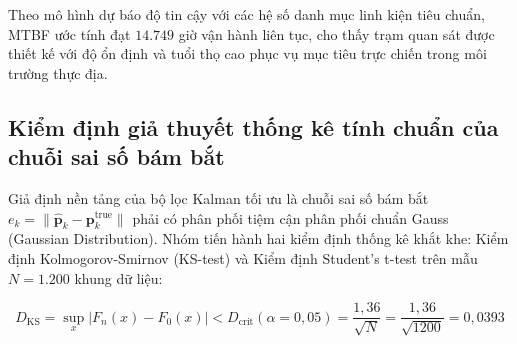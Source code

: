 \begin{table}[H]
\centering
\caption{Phân rã tỷ lệ hỏng hóc và độ tin cậy các khối phần cứng trong trạm quan sát}
\label{tab:hardware-reliability-breakdown}
\end{table}

Theo mô hình dự báo độ tin cậy với các hệ số danh mục linh kiện tiêu chuẩn, MTBF ước tính đạt $14.749$ giờ vận hành liên tục, cho thấy trạm quan sát được thiết kế với độ ổn định và tuổi thọ cao phục vụ mục tiêu trực chiến trong môi trường thực địa.

\subsection{Kiểm định giả thuyết thống kê tính chuẩn của chuỗi sai số bám bắt}

\hspace{0.5cm} Giả định nền tảng của bộ lọc Kalman tối ưu là chuỗi sai số bám bắt $e_k = \|\hat{\mathbf{p}}_k - \mathbf{p}_k^{\text{true}}\|$ phải có phân phối tiệm cận phân phối chuẩn Gauss (Gaussian Distribution). Nhóm tiến hành hai kiểm định thống kê khắt khe: Kiểm định Kolmogorov-Smirnov (KS-test) và Kiểm định Student's t-test trên mẫu $N = 1.200$ khung dữ liệu:

\begin{equation}
D_{\text{KS}} = \sup_x |F_n(x) - F_0(x)| < D_{\text{crit}}(\alpha = 0{,}05) = \frac{1{,}36}{\sqrt{N}} = \frac{1{,}36}{\sqrt{1200}} = 0{,}0393
\label{eq:ks-test-statistic-formula}
\end{equation}

